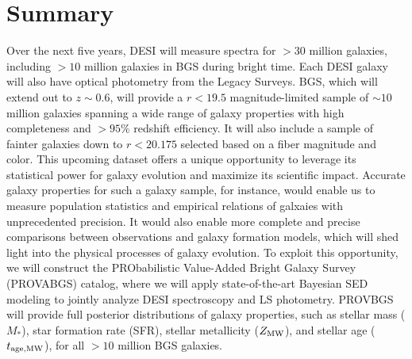 \section{Summary}
Over the next five years, DESI will measure spectra for ${>}30$ million
galaxies, including ${>}10$ million galaxies in BGS during bright time.
Each DESI galaxy will also have optical photometry from the Legacy Surveys. 
BGS, which will extend out to $z\sim0.6$, will provide a $r < 19.5$
magnitude-limited sample of ${\sim}10$ million galaxies spanning a wide range
of galaxy properties with high completeness and ${>}95\%$ redshift efficiency.
It will also include a sample of fainter galaxies down to $r < 20.175$ selected
based on a fiber magnitude and color. 
This upcoming dataset offers a unique opportunity to leverage its statistical
power for galaxy evolution and maximize its scientific impact. 
Accurate galaxy properties for such a galaxy sample, for instance,  would
enable us to measure population statistics and empirical relations of galxaies
with unprecedented precision. 
It would also enable more complete and precise comparisons between observations
and galaxy formation models, which will shed light into the physical processes
of galaxy evolution.
To exploit this opportunity, we will construct the PRObabilistic Value-Added
Bright Galaxy Survey (PROVABGS) catalog, where we will apply state-of-the-art
Bayesian SED modeling to jointly analyze DESI spectroscopy and LS photometry. 
PROVBGS will provide full posterior distributions of galaxy properties, such as
stellar mass ($M_*$), star formation rate (SFR), stellar metallicity 
($Z_{\rm MW}$), and stellar age ($t_{\rm age, MW}$), for all ${>}10$ million BGS galaxies.

